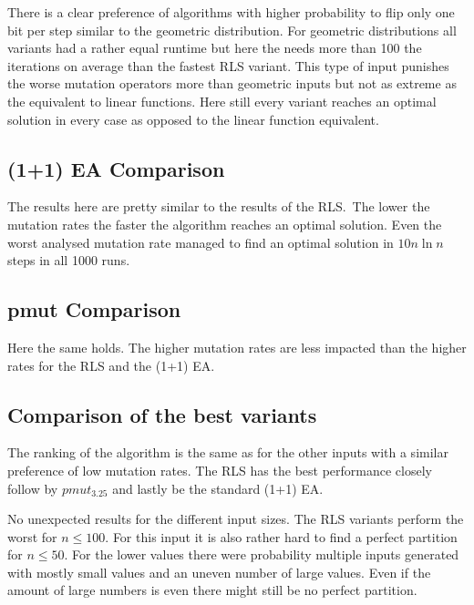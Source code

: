 There is a clear preference of algorithms with higher probability to flip only one bit per step similar to the geometric distribution.
For geometric distributions all variants had a rather equal runtime but here the \RLSN[4] needs more than 100 the iterations on average than the fastest RLS variant.
This type of input punishes the worse mutation operators more than geometric inputs but not as extreme as the equivalent to linear functions.
Here still every variant reaches an optimal solution in every case as opposed to the linear function equivalent.
\subsection{(1+1) EA Comparison}




The results here are pretty similar to the results of the RLS.\
The lower the mutation rates the faster the algorithm reaches an optimal solution.
Even the worst analysed mutation rate managed to find an optimal solution in $10n\ln n$ steps in all 1000 runs.

\subsection{pmut Comparison}




Here the same holds.
The higher mutation rates are less impacted than the higher rates for the RLS and the (1+1) EA.
\subsection{Comparison of the best variants}




The ranking of the algorithm is the same as for the other inputs with a similar preference of low mutation rates.
The RLS has the best performance closely follow by $pmut_{3.25}$ and lastly be the standard (1+1) EA.



No unexpected results for the different input sizes.
The RLS variants perform the worst for $n\le 100$.
For this input it is also rather hard to find a perfect partition for $n\le50$.
For the lower values there were probability multiple inputs generated with mostly small values and an uneven number of large values.
Even if the amount of large numbers is even there might still be no perfect partition.

